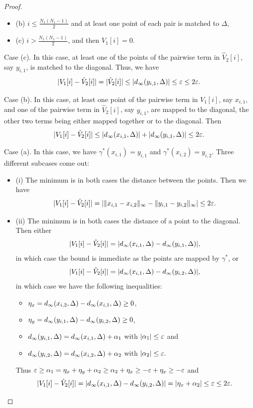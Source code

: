 \begin{proof}
\begin{itemize}
\item (b) $i\leq \frac{N_1(N_1-1)}{2}$ and at least one point of each pair is matched to $\Delta$,

\item (c) $i>\frac{N_1(N_1-1)}{2}$, and then $V_1[i]=0$.
\end{itemize}

Case (c). In this case, at least one of the points of the pairwise term in $\hat{V}_2[i]$, 
say $y_{i,1}$, is matched to the diagonal. Thus, we have
$$|V_1[i]-\hat{V}_2[i]|=|\hat{V}_2[i]|\leq |d_\infty(y_{i,1},\Delta)|\leq\varepsilon\leq 2\varepsilon.$$

Case (b). In this case, at least one point of the pairwise term in $V_1[i]$, 
say $x_{i,1}$, and one of the pairwise term in $\hat{V}_2[i]$, 
say $y_{i,1}$, are mapped to the diagonal, the other two terms
being either mapped together or to the diagonal. Then
$$|V_1[i]-\hat{V}_2[i]|\leq |d_\infty(x_{i,1},\Delta)|+|d_\infty(y_{i,1},\Delta)|\leq 2\varepsilon.$$

Case (a). In this case, we have 
$\gamma^*(x_{i,1})=y_{i,1}$ and $\gamma^*(x_{i,2})=y_{i,2}$. 
Three different subcases come out:
 
\begin{itemize}
\item (i) The minimum is in both cases the distance between the points. Then we have 
$$|V_1[i]-\hat{V}_2[i]|=|\|x_{i,1}-x_{i,2}\|_\infty-\|y_{i,1}-y_{i,2}\|_\infty|\leq 2\varepsilon.$$

\item (ii) The minimum is in both cases the distance of a point to the diagonal. 
Then either $$|V_1[i]-\hat{V}_2[i]|=|d_\infty(x_{i,1},\Delta)-d_\infty(y_{i,1},\Delta)|,$$
in which case the bound is immediate as the points are mapped by $\gamma^*$,
or $$|V_1[i]-\hat{V}_2[i]|=|d_\infty(x_{i,1},\Delta)-d_\infty(y_{i,2},\Delta)|,$$
in which case we have the following inequalities:
\begin{itemize}
\item $\eta_x=d_\infty(x_{i,2},\Delta)-d_\infty(x_{i,1},\Delta)\geq 0$,
\item $\eta_y=d_\infty(y_{i,1},\Delta)-d_\infty(y_{i,2},\Delta)\geq 0$,
\item $d_\infty(y_{i,1},\Delta)=d_\infty(x_{i,1},\Delta)+\alpha_1$ with $|\alpha_1|\leq\varepsilon$ and
\item $d_\infty(y_{i,2},\Delta)=d_\infty(x_{i,2},\Delta)+\alpha_2$ with $|\alpha_2|\leq\varepsilon.$
\end{itemize}

Thus $\varepsilon\geq\alpha_1=\eta_x+\eta_y+\alpha_2\geq\alpha_2+\eta_x\geq-\varepsilon+\eta_x\geq-\varepsilon$ and 
$$|V_1[i]-\hat{V}_2[i]|=|d_\infty(x_{i,1},\Delta)-d_\infty(y_{i,2},\Delta)|=|\eta_x+\alpha_2|\leq\varepsilon\leq 2\varepsilon.$$


\end{itemize}
\end{proof}
